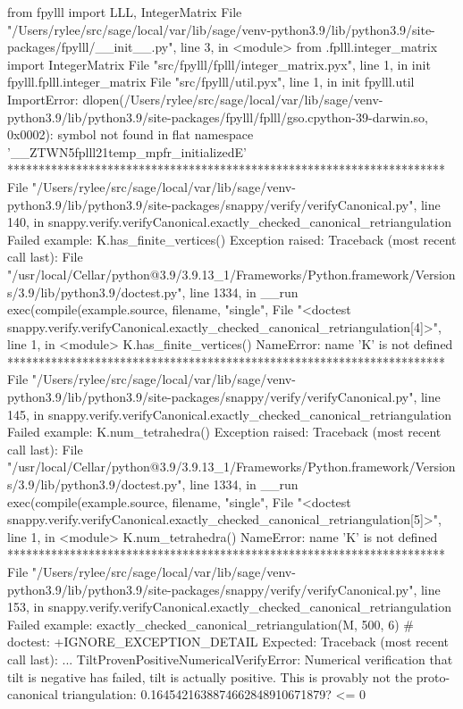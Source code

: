         from fpylll import LLL, IntegerMatrix
      File "/Users/rylee/src/sage/local/var/lib/sage/venv-python3.9/lib/python3.9/site-packages/fpylll/__init__.py", line 3, in <module>
        from .fplll.integer_matrix import IntegerMatrix
      File "src/fpylll/fplll/integer_matrix.pyx", line 1, in init fpylll.fplll.integer_matrix
      File "src/fpylll/util.pyx", line 1, in init fpylll.util
    ImportError: dlopen(/Users/rylee/src/sage/local/var/lib/sage/venv-python3.9/lib/python3.9/site-packages/fpylll/fplll/gso.cpython-39-darwin.so, 0x0002): symbol not found in flat namespace '__ZTWN5fplll21temp_mpfr_initializedE'
**********************************************************************
File "/Users/rylee/src/sage/local/var/lib/sage/venv-python3.9/lib/python3.9/site-packages/snappy/verify/verifyCanonical.py", line 140, in snappy.verify.verifyCanonical.exactly_checked_canonical_retriangulation
Failed example:
    K.has_finite_vertices()
Exception raised:
    Traceback (most recent call last):
      File "/usr/local/Cellar/python@3.9/3.9.13_1/Frameworks/Python.framework/Versions/3.9/lib/python3.9/doctest.py", line 1334, in __run
        exec(compile(example.source, filename, "single",
      File "<doctest snappy.verify.verifyCanonical.exactly_checked_canonical_retriangulation[4]>", line 1, in <module>
        K.has_finite_vertices()
    NameError: name 'K' is not defined
**********************************************************************
File "/Users/rylee/src/sage/local/var/lib/sage/venv-python3.9/lib/python3.9/site-packages/snappy/verify/verifyCanonical.py", line 145, in snappy.verify.verifyCanonical.exactly_checked_canonical_retriangulation
Failed example:
    K.num_tetrahedra()
Exception raised:
    Traceback (most recent call last):
      File "/usr/local/Cellar/python@3.9/3.9.13_1/Frameworks/Python.framework/Versions/3.9/lib/python3.9/doctest.py", line 1334, in __run
        exec(compile(example.source, filename, "single",
      File "<doctest snappy.verify.verifyCanonical.exactly_checked_canonical_retriangulation[5]>", line 1, in <module>
        K.num_tetrahedra()
    NameError: name 'K' is not defined
**********************************************************************
File "/Users/rylee/src/sage/local/var/lib/sage/venv-python3.9/lib/python3.9/site-packages/snappy/verify/verifyCanonical.py", line 153, in snappy.verify.verifyCanonical.exactly_checked_canonical_retriangulation
Failed example:
    exactly_checked_canonical_retriangulation(M, 500, 6)  # doctest: +IGNORE_EXCEPTION_DETAIL
Expected:
    Traceback (most recent call last):
    ...
    TiltProvenPositiveNumericalVerifyError: Numerical verification that tilt is negative has failed, tilt is actually positive. This is provably not the proto-canonical triangulation: 0.1645421638874662848910671879? <= 0
